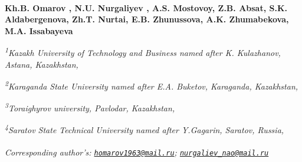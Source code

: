 
\begin{articleheader}

{\bfseries Kh.B. Omarov\textsuperscript{\envelope } ,
N.U. Nurgaliyev\textsuperscript{\envelope } ,
A.S. Mostovoy,
Z.B. Absat,
S.K. Aldabergenova,
Zh.T. Nurtai,
E.B. Zhunussova,
A.K. Zhumabekova,
M.A. Issabayeva}
\end{articleheader}

\begin{affiliation}
\emph{\textsuperscript{1}Kazakh University of Technology and Business named after K. Kulazhanov, Astana, Kazakhstan,}

\emph{\textsuperscript{2}Karaganda State University named after E.A. Buketov, Karaganda, Kazakhstan,}

\emph{\textsuperscript{3}Toraighyrov university, Pavlodar, Kazakhstan,}

\emph{\textsuperscript{4}Saratov State Technical University named after Y.Gagarin, Saratov, Russia,}

\raggedright \textsuperscript{\envelope }{\em Corresponding author's: \href{mailto:homarov1963@mail.ru}{\nolinkurl{homarov1963@mail.ru}}; \href{mailto:nurgaliev_nao@mail.ru}{\nolinkurl{nurgaliev\_nao@mail.ru}}}
\end{affiliation}

